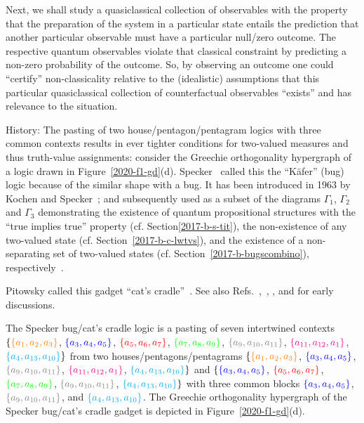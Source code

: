 Next, we shall study a quasiclassical collection of observables with the property that the preparation of the system in a particular state
entails the prediction that another particular observable must have a particular null/zero outcome.
The respective quantum observables violate that classical constraint by predicting a non-zero probability of the outcome.
So, by observing an outcome one could ``certify'' non-classicality relative to the (idealistic) assumptions
that this particular quasiclassical collection of counterfactual observables ``exists'' and has relevance to the situation.


History:
The pasting of two house/pentagon/pentagram logics with three common contexts results in ever tighter conditions for two-valued measures and thus truth-value assignments:
consider the Greechie orthogonality hypergraph of a logic drawn in Figure~\ref{2020-f1-gd}(d).
Specker~\cite{Specker-priv} called this the ``K\"afer'' (bug) logic because of the similar shape with a bug.
It has been introduced in 1963 by Kochen and Specker~\cite[Figure~1, p.~182]{kochen2};
and subsequently used as a subset of the diagrams $\Gamma_1$, $\Gamma_2$ and $\Gamma_3$ demonstrating
the existence of quantum propositional structures with the ``true implies true'' property (cf. Section\ref{2017-b-s-tit}),
the non-existence of any two-valued state (cf. Section~\ref{2017-b-c-lwtvs}),
and the existence of a non-separating set of two-valued states (cf. Section~\ref{2017-b-bugscombino}), respectively~\cite{kochen1}.

Pitowsky called this gadget ``cat's cradle''~\cite{Pitowsky2003395,pitowsky-06}.
See also Refs.~\cite{redhead},~\cite[Figure~B.l. p.~64]{Belinfante-73},
\cite[p.~588-589]{stairs83},
\cite[Sects.~IV, Figure~2]{clifton-93}  and \cite[p.~39, Figure~2.4.6]{pulmannova-91} for early discussions.


The Specker bug/cat's cradle logic is a pasting of seven intertwined contexts
$\{{\color{orange}\{a_1,a_2,a_3\} }
$, $
{\color{blue}\{a_3,a_4,a_5\} }
$, $
{\color{red}\{a_5,a_6,a_7\} }
$, $
{\color{green}\{a_7,a_8,a_9\} }
$, $
{\color{gray}\{a_{9},a_{10},a_{11}\} }
$, $
{\color{magenta}\{a_{11},a_{12},a_1\} }
$, $
{\color{cyan}\{a_4,a_{13},a_{10}\}}
\}$
from two houses/pentagons/pentagrams
$\{{\color{orange}\{a_1,a_2,a_3\} }
$, $
{\color{blue}\{a_3,a_4,a_5\} }
$, $
{\color{gray}\{a_{9},a_{10},a_{11}\} }
$, $
{\color{magenta}\{a_{11},a_{12},a_1\} }
$, $
{\color{cyan}\{a_4,a_{13},a_{10}\}}
\}$
and
$\{
{\color{blue}\{a_3,a_4,a_5\} }
$, $
{\color{red}\{a_5,a_6,a_7\} }
$, $
{\color{green}\{a_7,a_8,a_9\} }
$, $
{\color{gray}\{a_{9},a_{10},a_{11}\} }
$, $
{\color{cyan}\{a_4,a_{13},a_{10}\}}
\}$ with three common blocks
${\color{blue}\{a_3,a_4,a_5\} }$,
${\color{gray}\{a_{9},a_{10},a_{11}\} }$, and
${\color{cyan}\{a_4,a_{13},a_{10}\}}$.
The Greechie orthogonality hypergraph of the Specker bug/cat's cradle gadget is depicted in Figure~\ref{2020-f1-gd}(d).

